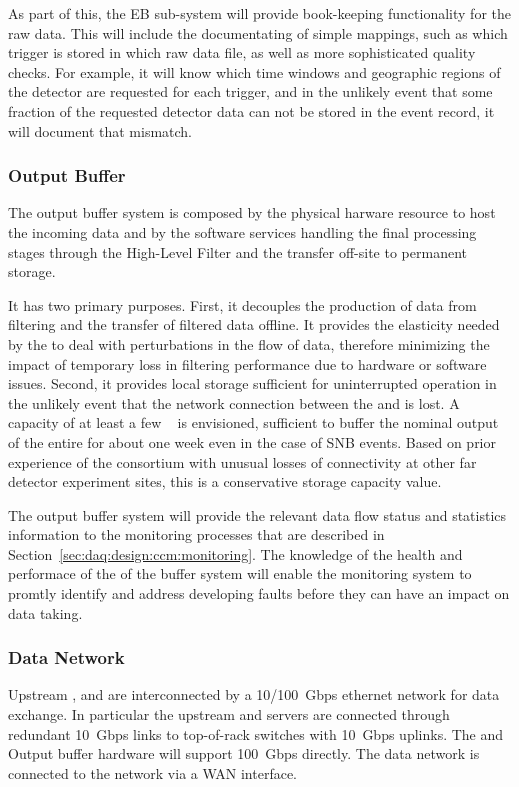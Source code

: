 As part of this, the EB sub-system will provide book-keeping functionality for the raw data.  This will include the documentating of simple mappings, such as which trigger is stored in which raw data file, as well as more sophisticated quality checks. For example, it will know which time windows and geographic regions of the detector are requested for each trigger, and in the unlikely event that some fraction of the requested detector data can not be stored in the event record, it will document that mismatch.

\subsubsection{Output Buffer}

The output buffer system is composed by the physical harware resource to host the incoming data and by the software services handling the final processing stages through the High-Level Filter and the transfer off-site to permanent storage.

It has two primary purposes.  First, it decouples the production of data from filtering and the
transfer of filtered data offline. It provides the elasticity needed by the  to deal with
perturbations in the flow of data, therefore minimizing the impact of temporary loss in filtering
performance due to hardware or software issues. Second, it provides local storage sufficient for
uninterrupted  operation in the unlikely event that the network connection between the
 and \fnal is lost.  A capacity of at least a few \si{\peta\byte} is envisioned,
sufficient to buffer the nominal output of the entire  for about one week even in the case of SNB events. Based on prior experience of the consortium with unusual losses of  connectivity at
other far detector experiment sites, this is a conservative storage capacity value.

The output buffer system will provide the relevant data flow status and statistics information to the monitoring processes that are described in Section~\ref{sec:daq:design:ccm:monitoring}. The knowledge of the health and performace of the of the buffer system will enable the monitoring system to promtly identify and address developing faults before they can have an impact on data taking.


\subsubsection{Data Network}
Upstream ,  and   are interconnected by a \SI{10/100}{ Gbps} ethernet network for data exchange.
In particular the upstream  and  servers are connected through redundant \SI{10}{ Gbps} links to top-of-rack switches with \SI{10}{Gbps} uplinks.
The  and Output buffer hardware will support \SI{100}{Gbps} directly.
The  data network is connected to the \fnal network via a WAN interface.

